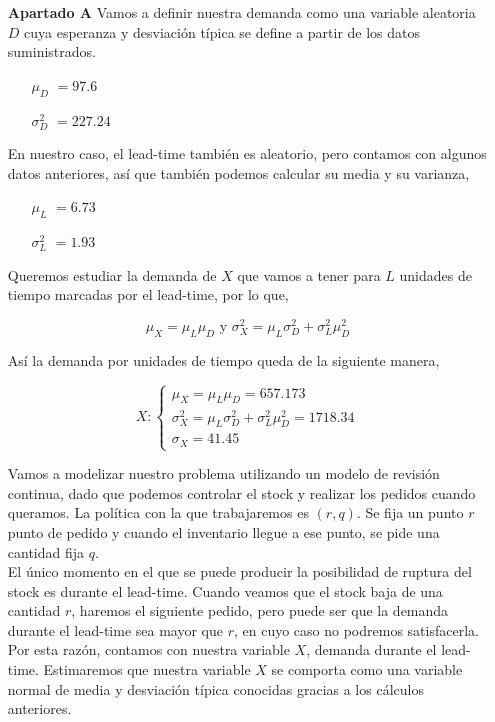 \documentclass[a4paper,12pt]{article}
\begin{document}
\begin{itemize}

\item[\textbf{Apartado A}
]
Vamos a definir nuestra demanda como una variable aleatoria $D$ cuya esperanza y desviaci\'on t\'ipica se define a partir de los datos suministrados.

\begin{itemize}
\item[] \textbf{$\mu_D$} $= 97.6$
\item[] \textbf{$\sigma_D^2$} $= 227.24$
\end{itemize}

En nuestro caso, el lead-time tambi\'en es aleatorio, pero contamos con algunos datos anteriores, as\'i que tambi\'en podemos calcular su media y su varianza,

\begin{itemize}
\item[] \textbf{$\mu_L$} $= 6.73$
\item[] \textbf{$\sigma_L^2$} $= 1.93$
\end{itemize}



Queremos estudiar la demanda de $X$ que vamos a tener para $L$ unidades de tiempo marcadas por el lead-time, por lo que,

$$\mu_X = \mu_L \mu_D \text{ y } \sigma_X^2 = \mu_L \sigma_D^2 + \sigma_L^2 \mu_D^2$$

As\'i la demanda por unidades de tiempo queda de la siguiente manera,


	\begin{equation*}
	X:  \left\lbrace \begin{array}{l}
		\mu_X = \mu_L \mu_D = 657.173\\
		\sigma_X^2 = \mu_L \sigma_D^2 + \sigma_L^2 \mu_D^2 = 1718.34\\
		\sigma_X = 41.45
	\end{array}
	\right. 
	\end{equation*}

Vamos a modelizar nuestro problema utilizando un modelo de revisi\'on continua, dado que podemos controlar el stock y realizar los pedidos cuando queramos. La pol\'itica con la que trabajaremos es $(r, q)$. Se fija un punto $r$ punto de pedido y cuando el inventario llegue a ese punto, se pide una cantidad fija $q$. \\

El \'unico momento en el que se puede producir la posibilidad de ruptura del stock es durante el lead-time. Cuando veamos que el stock baja de una cantidad $r$, haremos el siguiente pedido, pero puede ser que la demanda durante el lead-time sea mayor que $r$, en cuyo caso no podremos satisfacerla. Por esta raz\'on, contamos con nuestra variable $X$, demanda durante el lead-time. Estimaremos que nuestra variable $X$ se comporta como una variable normal de media y desviaci\'on t\'ipica conocidas gracias a los c\'alculos anteriores.\\


\end{itemize}
\end{document}
